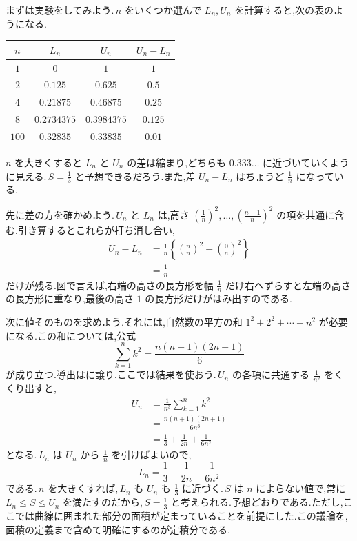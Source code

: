 まずは実験をしてみよう.\,$n$ をいくつか選んで $L_n,U_n$ を計算すると,次の表のようになる.
\begin{center}
\begin{tabular}{cccc}
\toprule
$n$ & $L_n$ & $U_n$ & $U_n-L_n$\\
\midrule
$1$ & $0$ & $1$ & $1$\\
$2$ & $0.125$ & $0.625$ & $0.5$\\
$4$ & $0.21875$ & $0.46875$ & $0.25$\\
$8$ & $0.2734375$ & $0.3984375$ & $0.125$\\
$100$ & $0.32835$ & $0.33835$ & $0.01$\\
\bottomrule
\end{tabular}
\end{center}
$n$ を大きくすると $L_n$ と $U_n$ の差は縮まり,どちらも $0.333\ldots$ に近づいていくように見える.\,$S=\frac13$ と予想できるだろう.また,差 $U_n-L_n$ はちょうど $\frac1n$ になっている.

先に差の方を確かめよう.\,$U_n$ と $L_n$ は,高さ $\left(\frac1n\right)^2,\ldots,\left(\frac{n-1}n\right)^2$ の項を共通に含む.引き算するとこれらが打ち消し合い,
\begin{align*}
 U_n-L_n
 &=\frac1n\left\{\left(\frac nn\right)^2-\left(\frac0n\right)^2\right\}\\
 &=\frac1n
\end{align*}
だけが残る.図で言えば,右端の高さの長方形を幅 $\frac1n$ だけ右へずらすと左端の高さの長方形に重なり,最後の高さ $1$ の長方形だけがはみ出すのである.

次に値そのものを求めよう.それには,自然数の平方の和 $1^2+2^2+\cdots+n^2$ が必要になる.この和については,公式
\[
 \sum_{k=1}^{n}k^2=\frac{n(n+1)(2n+1)}6
\]
が成り立つ.導出はに譲り,ここでは結果を使おう.\,$U_n$ の各項に共通する $\frac1{n^2}$ をくくり出すと,
\begin{align*}
 U_n&=\frac1{n^3}\sum_{k=1}^{n}k^2\\
 &=\frac{n(n+1)(2n+1)}{6n^3}\\
 &=\frac13+\frac{1}{2n}+\frac{1}{6n^2}
\end{align*}
となる.\,$L_n$ は $U_n$ から $\frac1n$ を引けばよいので,
\[
 L_n=\frac13-\frac{1}{2n}+\frac{1}{6n^2}
\]
である.\,$n$ を大きくすれば,\,$L_n$ も $U_n$ も $\frac13$ に近づく.\,$S$ は $n$ によらない値で,常に $L_n\le S\le U_n$ を満たすのだから,\,$S=\frac13$ と考えられる.予想どおりである.ただし,ここでは曲線に囲まれた部分の面積が定まっていることを前提にした.この議論を,面積の定義まで含めて明確にするのが定積分である.

